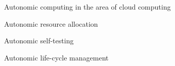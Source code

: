 
Autonomic computing in the area of cloud computing

Autonomic resource allocation 
\cite{inproceedingshu2009}
\cite{Casalicchio:2013:ARP:2494621.2494623}

Autonomic self-testing
\cite{5463688}


Autonomic life-cycle management








